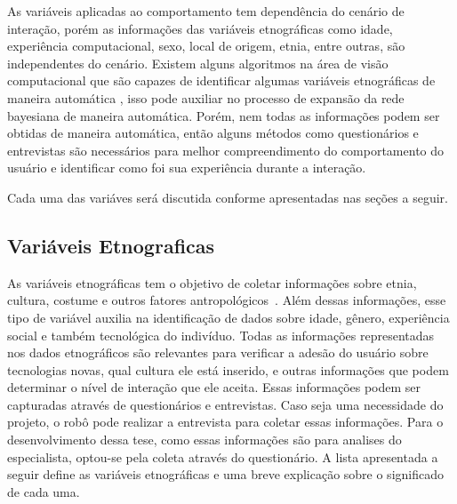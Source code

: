 As variáveis aplicadas ao comportamento tem dependência do cenário de interação, porém as informações das variáveis etnográficas como idade, experiência computacional, sexo, local de origem, etnia, entre outras, são independentes do cenário. Existem alguns algoritmos na área de visão computacional que são capazes de identificar algumas variáveis etnográficas de maneira automática \cite{yang:2007, shan:2012, ylioinas:2012, samadi:2013, amaral:2014}, isso pode auxiliar no processo de expansão da rede bayesiana de maneira automática. Porém, nem todas as informações podem ser obtidas de maneira automática, então alguns métodos como questionários e entrevistas são necessários para melhor compreendimento do comportamento do usuário e identificar como foi sua experiência durante a interação.

Cada uma das variáves será discutida conforme apresentadas nas seções a seguir.

\subsection{Variáveis Etnograficas}
\label{sec:etnograficas}
As variáveis etnográficas tem o objetivo de coletar informações sobre etnia, cultura, costume e outros fatores antropológicos~\cite{borges:2005}. Além dessas informações, esse tipo de variável auxilia na identificação de dados sobre idade, gênero, experiência social e também tecnológica do indivíduo. Todas as informações representadas nos dados etnográficos são relevantes para verificar a adesão do usuário sobre tecnologias novas, qual cultura ele está inserido, e outras informações que podem determinar o nível de interação que ele aceita. Essas informações podem ser capturadas através de questionários e entrevistas. Caso seja uma necessidade do projeto, o robô pode realizar a entrevista para coletar essas informações. Para o desenvolvimento dessa tese, como essas informações são para analises do especialista, optou-se pela coleta através do questionário. A lista apresentada a seguir define as variáveis etnográficas e uma breve explicação sobre o significado de cada uma.

